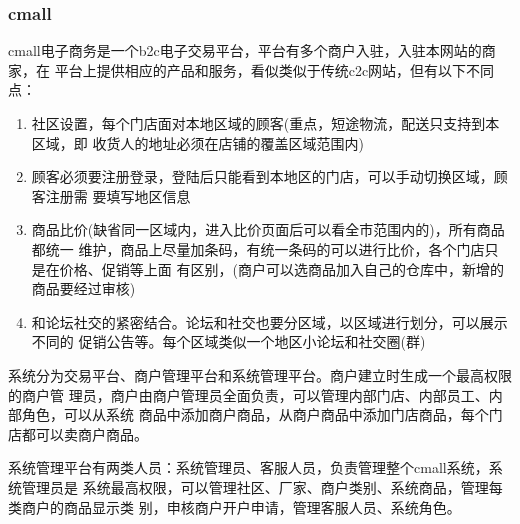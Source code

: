 \subsubsection{cmall}

cmall电子商务是一个b2c电子交易平台，平台有多个商户入驻，入驻本网站的商家，在
平台上提供相应的产品和服务，看似类似于传统c2c网站，但有以下不同点：
\begin{enumerate}
\item 社区设置，每个门店面对本地区域的顾客(重点，短途物流，配送只支持到本区域，即
  收货人的地址必须在店铺的覆盖区域范围内)
\item 顾客必须要注册登录，登陆后只能看到本地区的门店，可以手动切换区域，顾客注册需
  要填写地区信息
\item 商品比价(缺省同一区域内，进入比价页面后可以看全市范围内的)，所有商品都统一
  维护，商品上尽量加条码，有统一条码的可以进行比价，各个门店只是在价格、促销等上面
  有区别，(商户可以选商品加入自己的仓库中，新增的商品要经过审核)
\item 和论坛社交的紧密结合。论坛和社交也要分区域，以区域进行划分，可以展示不同的
  促销公告等。每个区域类似一个地区小论坛和社交圈(群)
\end{enumerate}

系统分为交易平台、商户管理平台和系统管理平台。商户建立时生成一个最高权限的商户管
理员，商户由商户管理员全面负责，可以管理内部门店、内部员工、内部角色，可以从系统
商品中添加商户商品，从商户商品中添加门店商品，每个门店都可以卖商户商品。

系统管理平台有两类人员：系统管理员、客服人员，负责管理整个cmall系统，系统管理员是
系统最高权限，可以管理社区、厂家、商户类别、系统商品，管理每类商户的商品显示类
别，申核商户开户申请，管理客服人员、系统角色。

\newpage
